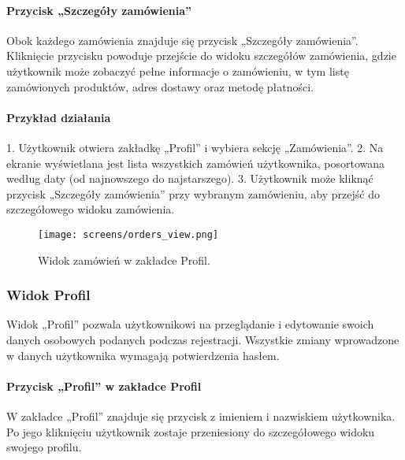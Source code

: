 \documentclass[12pt,a4paper,oneside]{article}
\theoremstyle{definition}
\numberwithin{equation}{section}
\begin{document}
\paragraph{Przycisk „Szczegóły zamówienia”}
Obok każdego zamówienia znajduje się przycisk „Szczegóły zamówienia”. Kliknięcie przycisku powoduje przejście do widoku szczegółów zamówienia, gdzie użytkownik może zobaczyć pełne informacje o zamówieniu, w tym listę zamówionych produktów, adres dostawy oraz metodę płatności.

\paragraph{Przykład działania}
1. Użytkownik otwiera zakładkę „Profil” i wybiera sekcję „Zamówienia”.
2. Na ekranie wyświetlana jest lista wszystkich zamówień użytkownika, posortowana według daty (od najnowszego do najstarszego).
3. Użytkownik może kliknąć przycisk „Szczegóły zamówienia” przy wybranym zamówieniu, aby przejść do szczegółowego widoku zamówienia.

\begin{figure}[h!]
    \centering
    \texttt{[image: screens/orders\_view.png]}
    \caption{Widok zamówień w zakładce Profil.}
    \label{fig:orders_view}
\end{figure}




\subsubsection{Widok Profil}
Widok „Profil” pozwala użytkownikowi na przeglądanie i edytowanie swoich danych osobowych podanych podczas rejestracji. Wszystkie zmiany wprowadzone w danych użytkownika wymagają potwierdzenia hasłem.

\paragraph{Przycisk „Profil” w zakładce Profil}
W zakładce „Profil” znajduje się przycisk z imieniem i nazwiskiem użytkownika. Po jego kliknięciu użytkownik zostaje przeniesiony do szczegółowego widoku swojego profilu.
\end{document}

